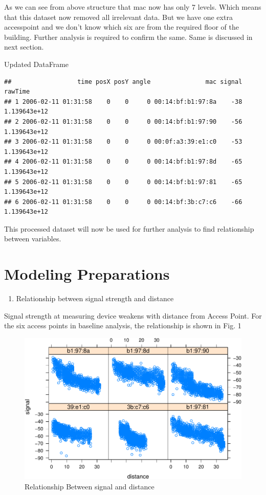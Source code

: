 \documentclass[
]{article}
\providecommand{\tightlist}{%
  \setlength{\itemsep}{0pt}\setlength{\parskip}{0pt}}
\begin{document}
As we can see from above structure that mac now has only 7 levels. Which
means that this dataset now removed all irrelevant data. But we have one
extra accesspoint and we don't know which six are from the required
floor of the building. Further analysis is required to confirm the same.
Same is discussed in next section.

Updated DataFrame

\begin{verbatim}
##                  time posX posY angle               mac signal      rawTime
## 1 2006-02-11 01:31:58    0    0     0 00:14:bf:b1:97:8a    -38 1.139643e+12
## 2 2006-02-11 01:31:58    0    0     0 00:14:bf:b1:97:90    -56 1.139643e+12
## 3 2006-02-11 01:31:58    0    0     0 00:0f:a3:39:e1:c0    -53 1.139643e+12
## 4 2006-02-11 01:31:58    0    0     0 00:14:bf:b1:97:8d    -65 1.139643e+12
## 5 2006-02-11 01:31:58    0    0     0 00:14:bf:b1:97:81    -65 1.139643e+12
## 6 2006-02-11 01:31:58    0    0     0 00:14:bf:3b:c7:c6    -66 1.139643e+12
\end{verbatim}

This processed dataset will now be used for further analysis to find
relationship between variables.

\newpage

\hypertarget{modeling-preparations}{%
\section{Modeling Preparations}\label{modeling-preparations}}

\begin{enumerate}
\def\labelenumi{\arabic{enumi}.}
\tightlist
\item
  Relationship between signal strength and distance
\end{enumerate}

Signal strength at measuring device weakens with distance from Access
Point. For the six access points in baseline analysis, the relationship
is shown in Fig. 1

\begin{figure}[H]
\includegraphics{msds7333_case_study01_files/figure-latex/summary_plot-1} \caption{Relationship Between signal and distance}\label{fig:summary_plot}
\end{figure}
\end{document}
